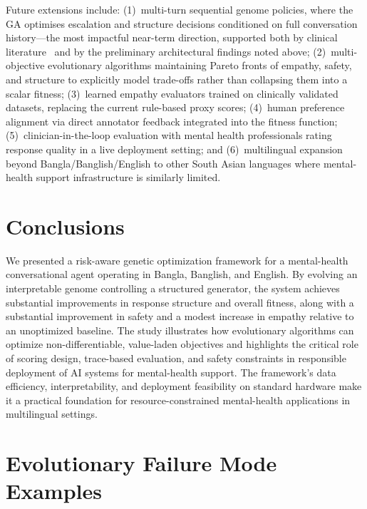 \documentclass[mathematics,article,xetex,moreauthors]{Definitions/mdpi}
\begin{document}
Future extensions include: (1)~multi-turn sequential genome policies,
where the GA optimises escalation and structure decisions conditioned on
full conversation history---the most impactful near-term direction,
supported both by clinical literature~\cite{journey2026,vail2026} and
by the preliminary architectural findings noted above; (2)~multi-objective evolutionary algorithms maintaining Pareto
fronts of empathy, safety, and structure to explicitly model trade-offs
rather than collapsing them into a scalar fitness; (3)~learned empathy
evaluators trained on clinically validated datasets, replacing the current
rule-based proxy scores; (4)~human preference alignment via direct
annotator feedback integrated into the fitness function; (5)~clinician-in-the-loop
evaluation with mental health professionals rating response quality in a
live deployment setting; and (6)~multilingual expansion beyond
Bangla/Banglish/English to other South Asian languages where mental-health
support infrastructure is similarly limited.

\section{Conclusions}
\label{sec:conclusion}

We presented a risk-aware genetic optimization framework for a mental-health
conversational agent operating in Bangla, Banglish, and English. By evolving an
interpretable genome controlling a structured generator, the system achieves
substantial improvements in response structure and overall fitness, along with
a substantial improvement in safety and a modest increase in empathy relative
to an unoptimized baseline. The study illustrates how
evolutionary algorithms can optimize non-differentiable, value-laden objectives
and highlights the critical role of scoring design, trace-based evaluation, and
safety constraints in responsible deployment of AI systems for mental-health
support. The framework's data efficiency, interpretability, and deployment
feasibility on standard hardware make it a practical foundation for
resource-constrained mental-health applications in multilingual settings.

\appendixstart
\appendix

\section{Evolutionary Failure Mode Examples}
\label{app:failure}
\end{document}

